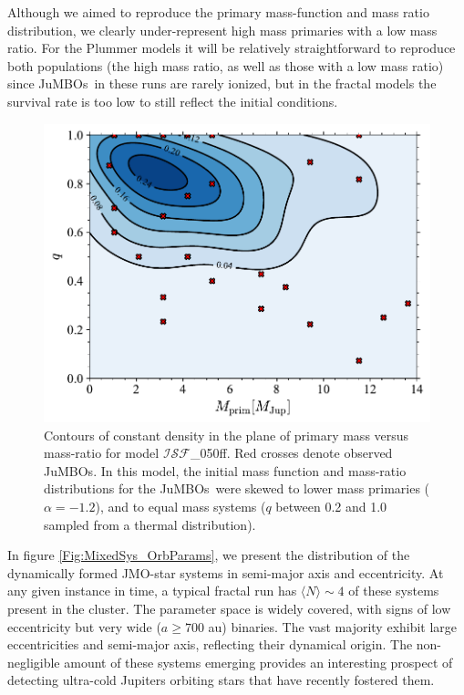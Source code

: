 \documentclass[submission,phys]{lib/SciPost}
\newcommand{\jumbos}{\mbox{JuMBOs}}
\begin{document}
Although we aimed to reproduce the primary mass-function and mass
ratio distribution, we clearly under-represent high mass primaries
with a low mass ratio. For the Plummer models it will be relatively
straightforward to reproduce both populations (the high mass ratio, as
well as those with a low mass ratio) since \jumbos\, in these runs are
rarely ionized, but in the fractal models the survival rate is too low
to still reflect the initial conditions.

   \begin{figure}
    \centering
    \includegraphics[width=0.75\columnwidth]{figures/Fractal_rvir0.5_Obs_mass_distr.pdf}
    \caption{Contours of constant density in the plane of primary mass
      versus mass-ratio for model $\mathcal{ISF}$\_050ff. Red crosses
      denote observed \jumbos.  In this model, the initial mass
      function and mass-ratio distributions for the \jumbos\, were
      skewed to lower mass primaries ($\alpha = -1.2$), and to equal
      mass systems ($q$ between 0.2 and 1.0 sampled from a thermal
      distribution).  }
         \label{Fig:FractalObs_mdistr}
   \end{figure}

In figure \ref{Fig:MixedSys_OrbParams}, we present the distribution of
the dynamically formed JMO-star systems in semi-major axis and eccentricity.
At any given instance in time, a typical fractal run has $\langle N\rangle \sim 
4$ of these systems present in the cluster. The parameter space
is widely covered, with signs of low eccentricity but very wide
($a\geq700$ au) binaries. The vast majority exhibit
large eccentricities and semi-major axis, reflecting their dynamical
origin. The non-negligible amount of these systems emerging provides an
interesting prospect of detecting ultra-cold Jupiters orbiting stars
that have recently fostered them.
\end{document}
